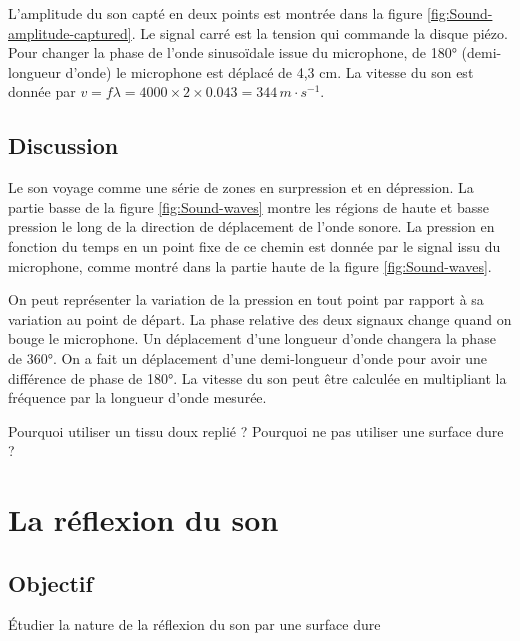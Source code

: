 \documentclass{book}
\begin{document}
L'amplitude du son capté en deux points est montrée dans la figure  \ref{fig:Sound-amplitude-captured}. Le signal carré est la tension qui commande la disque piézo. Pour changer la phase de l'onde sinusoïdale issue du microphone, de 180° (demi-longueur d'onde) le microphone est déplacé de 4,3 cm. La vitesse du son est donnée par $v=f\lambda=4000\times2\times0.043=344\, m\cdot s^{-1}$.

\subsection{Discussion}


Le son voyage comme une série de zones en surpression et en dépression. La partie basse de la figure  \ref{fig:Sound-waves} montre les régions de haute et basse pression le long de la direction de déplacement de l'onde sonore. La pression en fonction du temps en un point fixe de ce chemin est donnée par le signal issu du microphone, comme montré dans la partie haute de la figure  \ref{fig:Sound-waves}.



On peut représenter la variation de la pression en tout point par rapport à sa variation au point de départ. La phase relative des deux signaux change quand on bouge le microphone. Un déplacement d'une longueur d'onde changera la phase de 360°. On a fait un déplacement d'une demi-longueur d'onde pour avoir une différence de phase de 180°. La vitesse du son peut être calculée en multipliant la fréquence par la longueur d'onde mesurée.



Pourquoi utiliser un tissu doux replié ? Pourquoi ne pas utiliser une surface dure ?







\section{La réflexion du son}



\subsection{Objectif}


Étudier la nature de la réflexion du son par une surface dure
\end{document}
